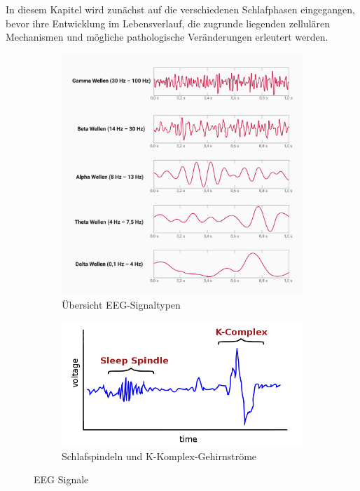 \documentclass[a4paper, 12pt]{article}
\begin{document}
In diesem Kapitel wird zunächst auf die verschiedenen Schlafphasen eingegangen, bevor ihre Entwicklung im Lebensverlauf, die zugrunde liegenden zellulären Mechanismen und mögliche pathologische Veränderungen erleutert werden.

\begin{figure}[htp]
    \centering
    \begin{subfigure}{0.5\textwidth}
        \centering
        \includegraphics[width=\textwidth]{eeg-baender_lg.jpg}
        \caption{Übersicht EEG-Signaltypen \cite{pic_eeg}}
        \label{EEG_pic}
    \end{subfigure}
    \hfill
    \begin{subfigure}{0.45\textwidth}
        \centering
        \includegraphics[width=\textwidth]{schlapfspindel_k_komplex.png}
        \caption{Schlafspindeln und K-Komplex-Gehirnströme \cite{pic_spin_k_komp}}
        \label{spind_k_pic}
    \end{subfigure}
    \caption{EEG Signale}
\end{figure}
\end{document}
